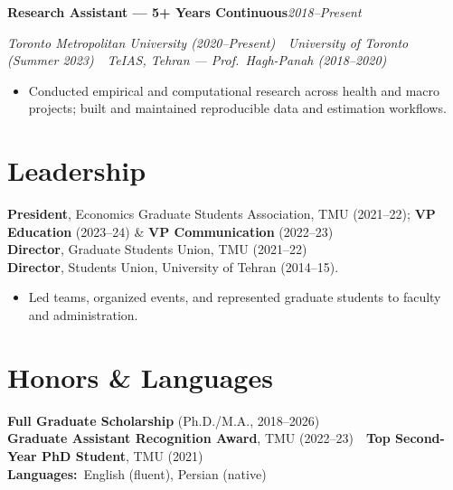 \documentclass[10pt]{article}
\newcommand{\entry}[2]{%
  \noindent\textbf{#1}\hfill{\small\itshape #2}\par\vspace{1pt}}
\newcommand{\subentry}[1]{\noindent\textit{#1}\par\vspace{1pt}}
\begin{document}
\entry{Research Assistant — 5+ Years Continuous}{2018--Present}
\subentry{Toronto Metropolitan University (2020--Present) \,\textbar\, University of Toronto (Summer 2023) \,\textbar\, TeIAS, Tehran — Prof.\ Hagh-Panah (2018--2020)}
\begin{itemize}
\item Conducted empirical and computational research across health and macro projects; built and maintained reproducible data and estimation workflows.
\end{itemize}

\section{Leadership}
{\small
\textbf{President}, Economics Graduate Students Association, TMU (2021--22); \textbf{VP Education} (2023--24) \& \textbf{VP Communication} (2022--23) \\ \textbf{Director}, Graduate Students Union, TMU (2021--22) \\ \textbf{Director}, Students Union, University of Tehran (2014--15). 
\begin{itemize}
\item Led teams, organized events, and represented graduate students to faculty and administration.
\end{itemize}
}

\section{Honors \& Languages}
{\small
\textbf{Full Graduate Scholarship} (Ph.D./M.A., 2018--2026) \\[2pt] \textbf{Graduate Assistant Recognition Award}, TMU (2022--23) \,\textbar\, \textbf{Top Second-Year PhD Student}, TMU (2021) \\[2pt]
\textbf{Languages:}\, English (fluent), Persian (native)
}
\end{document}

